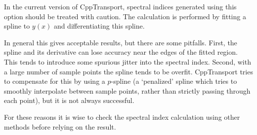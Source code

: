 \documentclass[11pt,a4paper]{article}
\newenvironment{warning}{\begin{tcolorbox}[enhanced,breakable,colback=red!10,colbacktitle=red!20,colframe=red!40,coltitle=black,title={Warning},fonttitle=\sffamily\fontseries{b}\selectfont]}{\end{tcolorbox}}
\newcommand{\packagefont}{\sffamily}
\newcommand{\CppTransport}{{\packagefont CppTransport}}
\begin{document}
\begin{warning}
    In the current version of {\CppTransport},
    spectral indices generated using this option should be treated
    with caution.
    The calculation is performed by fitting a spline to $y(x)$
    and differentiating this spline.

    In general this gives acceptable results, but there are some pitfalls.
    First, the spline and its derivative can lose accuracy near the edges of the
    fitted region.
    This tends to introduce some spurious jitter into the spectral index.
    Second, with a large number of sample points the spline tends to
    be overfit. {\CppTransport} tries to compensate for this by using a
    $p$-spline (a `penalized' spline which tries to smoothly interpolate
    between sample points, rather than strictly passing through each point),
    but it is not always successful.
    
    For these reasons it is wise to check the spectral index calculation using
    other methods before relying on the result.
\end{warning}
\end{document}
